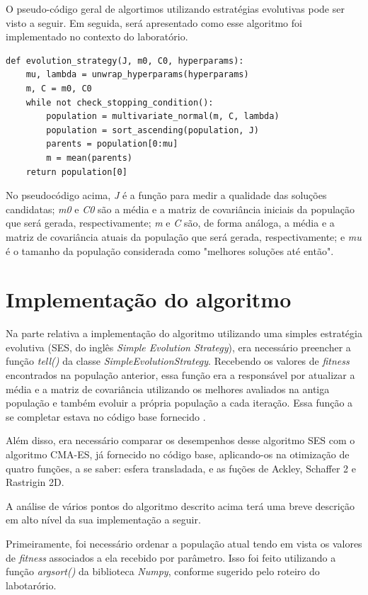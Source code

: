 \documentclass[conference]{IEEEtran}
\begin{document}
O pseudo-código geral de algortimos utilizando estratégias evolutivas pode ser visto a seguir. Em seguida, será apresentado como esse algoritmo foi implementado no contexto do laboratório.

\begin{lstlisting}
def evolution_strategy(J, m0, C0, hyperparams):
	mu, lambda = unwrap_hyperparams(hyperparams)
	m, C = m0, C0
	while not check_stopping_condition():
		population = multivariate_normal(m, C, lambda)
		population = sort_ascending(population, J)
		parents = population[0:mu]
		m = mean(parents)
	return population[0]
\end{lstlisting}

No pseudocódigo acima, \textit{J} é a função para medir a qualidade das soluções candidatas; \textit{m0} e \textit{C0} são a média e a matriz de covariância iniciais da população que será gerada, respectivamente; \textit{m} e \textit{C} são, de forma análoga, a média e a matriz de covariância atuais da população que será gerada, respectivamente; e \textit{mu} é o tamanho da população considerada como "melhores soluções até então".

\section{Implementação do algoritmo}
Na parte relativa a implementação do algoritmo utilizando uma simples estratégia evolutiva (SES, do inglês \textit{Simple Evolution Strategy}), era necessário preencher a função \textit{tell()} da classe \textit{SimpleEvolutionStrategy}. Recebendo os valores de \textit{fitness} encontrados na população anterior, essa função era a responsável por atualizar a média e a matriz de covariância utilizando os melhores avaliados na antiga população e também evoluir a própria população a cada iteração. Essa função a se completar estava no código base fornecido \cite{b1}.  

Além disso, era necessário comparar os desempenhos desse algoritmo SES com o algoritmo CMA-ES, já fornecido no código base, aplicando-os na otimização de quatro funções, a se saber: esfera transladada, e as fuções de Ackley, Schaffer 2 e Rastrigin 2D.

A análise de vários pontos do algoritmo descrito acima terá uma breve descrição em alto nível da sua implementação a seguir. 

Primeiramente, foi necessário ordenar a população atual tendo em vista os valores de \textit{fitness} associados a ela recebido por parâmetro. Isso foi feito utilizando a função \textit{argsort()} da biblioteca \textit{Numpy}, conforme sugerido pelo roteiro do labotarório.
\end{document}
